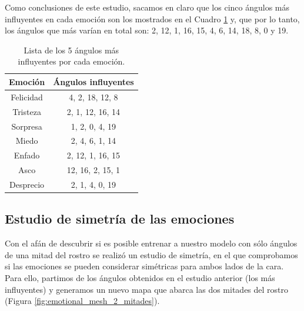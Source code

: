 Como conclusiones de este estudio, sacamos en claro que los cinco ángulos más influyentes en cada emoción son los mostrados en el Cuadro \ref{cuadro:angulos_5_influyentes} y, que por lo tanto, los ángulos que más varían en total son: 2, 12, 1, 16, 15, 4, 6, 14, 18, 8, 0 y 19.\\

\begin{table}[H]
\begin{center}
\begin{tabular}{|c|c|}
     \hline
    \textbf{Emoción} & \textbf{Ángulos influyentes} \\
    \hline
     Felicidad & 4, 2, 18, 12, 8 \\
     Tristeza & 2, 1, 12, 16, 14 \\
     Sorpresa & 1, 2, 0, 4, 19 \\
     Miedo & 2, 4, 6, 1, 14 \\
     Enfado & 2, 12, 1, 16, 15 \\
     Asco & 12, 16, 2, 15, 1 \\
     Desprecio & 2, 1, 4, 0, 19 \\
     \hline
 \end{tabular}
 \captionsetup{justification=centering}
\caption{Lista de los 5 ángulos más influyentes por cada emoción.}
\label{cuadro:angulos_5_influyentes}
\end{center}
\end{table}

\subsection{Estudio de simetría de las emociones}
Con el afán de descubrir si es posible entrenar a nuestro modelo con sólo ángulos de una mitad del rostro se realizó un estudio de simetría, en el que comprobamos si las emociones se pueden considerar simétricas para ambos lados de la cara. Para ello, partimos de los ángulos obtenidos en el estudio anterior (los más influyentes) y generamos un nuevo mapa que abarca las dos mitades del rostro (Figura \ref{fig:emotional_mesh_2_mitades}).\\

